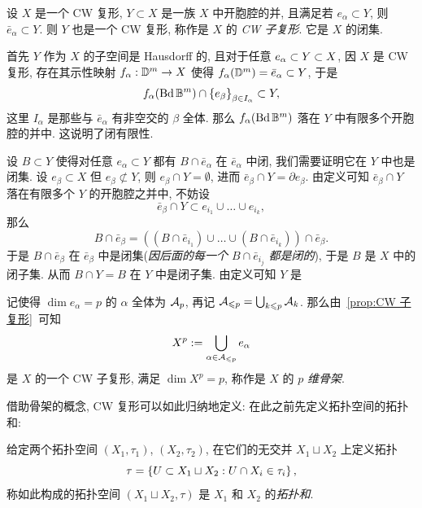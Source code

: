 \begin{De-Pr}[CW 子复形]\label{prop:CW 子复形}
	设 $ X $ 是一个 CW 复形, $ Y\subset X $ 是一族 $ X $ 中开胞腔的并, 且满足若 $ e_\alpha\subset Y $, 则 $ \bar{e}_\alpha\subset Y $. 则 $ Y $ 也是一个 CW 复形, 称作是 $ X $ 的 \emph{CW 子复形}. 它是 $ X $ 的闭集.
\end{De-Pr}
\begin{Proof}
	首先 $ Y $ 作为 $ X $ 的子空间是 Hausdorff 的, 且对于任意 $ e_\alpha\subset Y\subset X $, 因 $ X $ 是 CW 复形, 存在其示性映射 $ f_\alpha : \mathbb{D}^m\to X $ 使得 $ f_\alpha(\mathbb{D}^m)=\bar{e}_\alpha\subset Y $, 于是
	\[
		f_\alpha(\mathrm{Bd}\,\mathbb{B}^m)\cap\left\{ e_\beta \right\}_{\beta\in I_\alpha}\subset Y,
	\]
	这里 $ I_\alpha $ 是那些与 $ \bar{e}_\alpha $ 有非空交的 $ \beta $ 全体. 那么 $ f_\alpha(\mathrm{Bd}\,\mathbb{B}^m) $ 落在 $ Y $ 中有限多个开胞腔的并中. 这说明了闭有限性.

	设 $ B\subset Y $ 使得对任意 $ e_\alpha\subset Y $ 都有 $ B\cap\bar{e}_\alpha $ 在 $ \bar{e}_\alpha $ 中闭, 我们需要证明它在 $ Y $ 中也是闭集. 设 $ e_\beta\subset X $ 但 $ e_\beta\not\subset Y $, 则 $ e_\beta\cap Y=\emptyset $, 进而 $ \bar{e}_\beta\cap Y=\partial e_\beta $. 由定义可知 $ \bar{e}_\beta\cap Y $ 落在有限多个 $ Y $ 的开胞腔之并中, 不妨设
	\[
		\bar{e}_\beta\cap Y\subset e_{i_1}\cup\dots\cup e_{i_k},
	\]
	那么
	\[
		B\cap\bar{e}_\beta=((B\cap\bar{e}_{i_1})\cup\dots\cup(B\cap\bar{e}_{i_k}))\cap\bar{e}_\beta.
	\]
	于是 $ B\cap\bar{e}_\beta $ 在 $ \bar{e}_\beta $ 中是闭集(\textit{因后面的每一个 $ B\cap\bar{e}_{i_j} $ 都是闭的}), 于是 $ B $ 是 $ X $ 中的闭子集. 从而 $ B\cap Y=B $ 在 $ Y $ 中是闭子集. 由定义可知 $ Y $ 是
\end{Proof}

\begin{Corollary}[骨架]
	记使得 $ \dim e_\alpha=p $ 的 $ \alpha $ 全体为 $ \mathcal{A}_p $, 再记 $ \mathcal{A}_{\leqslant p}=\bigcup_{k\leqslant p}\mathcal{A}_k $. 那么由~\ref{prop:CW 子复形}~可知
	\[
		X^p:=\bigcup_{\alpha\in\mathcal{A}_{\leqslant p}}e_\alpha
	\]
	是 $ X $ 的一个 CW 子复形, 满足 $ \dim X^p=p $, 称作是 $ X $ 的 $ p $ \emph{维骨架}.
\end{Corollary}

借助骨架的概念, CW 复形可以如此归纳地定义: 在此之前先定义拓扑空间的拓扑和:

\begin{Definition}[拓扑和]
	给定两个拓扑空间 $ (X_1,\tau_1) $, $ (X_2,\tau_2) $, 在它们的无交并 $ X_1\sqcup X_2 $ 上定义拓扑
	\[
		\tau=\left\{ U\subset X_1\sqcup X_2 : U\cap X_i\in\tau_i \right\},
	\]
	称如此构成的拓扑空间 $ (X_1\sqcup X_2,\tau) $ 是 $ X_1 $ 和 $ X_2 $ 的\emph{拓扑和}.
\end{Definition}

